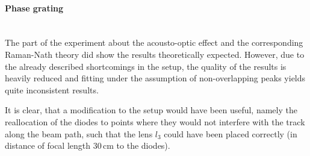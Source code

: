 \paragraph{Phase grating}~\\
The part of the experiment about the acousto-optic effect and the corresponding 
Raman-Nath theory did show the results theoretically expected. However, 
due to the already described shortcomings in the setup, the quality of the 
results is heavily reduced and fitting under the assumption of non-overlapping 
peaks yields quite inconsistent results. 

It is clear, that a modification to the setup would have been useful, 
namely the reallocation of the diodes to points where they would not interfere 
with the track along the beam path, such that the lens $l_3$ could have been placed 
correctly (in distance of focal length $30\,$cm to the diodes). 
